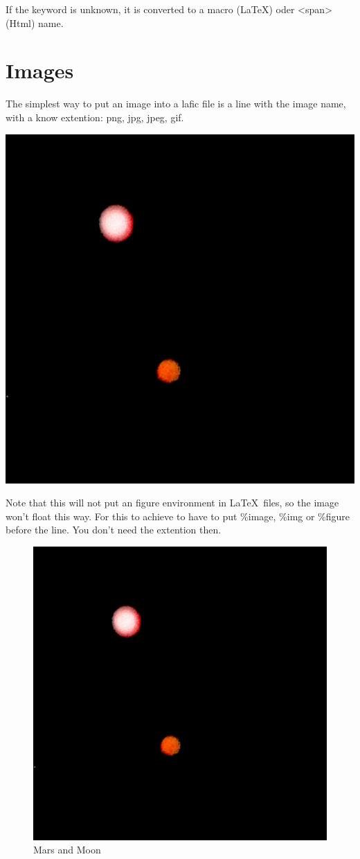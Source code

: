 \documentclass{scrartcl}
\begin{document}
{{If the keyword is unknown, it is converted to a macro
(LaTeX) oder <span> (Html) name.

\section{Images}

The simplest way to put an image into a lafic file is a
line with the image name, with a know extention: png, jpg,
jpeg, gif.

{\centering%
\includegraphics[width=.50\linewidth]{Image.png}
\\}

Note that this will not put an figure environment in \LaTeX\ 
files, so the image won't float this way. For this to
achieve to have to put \%image, \%img or \%figure before the
line. You don't need the extention then.

\begin{figure}[hbt]
\includegraphics[height=.40\textheight]{Image.png}
\caption{Mars and Moon}
\label{bild1}


\end{figure}}}
\end{document}
